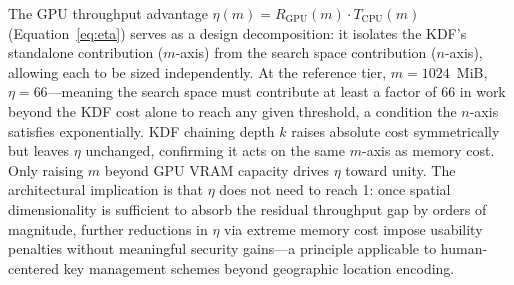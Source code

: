 \documentclass[mathematics,article,accept,pdftex,moreauthors]{Definitions/mdpi}
\begin{document}
{The GPU throughput advantage $\eta(m) = R_\text{GPU}(m)\cdot T_\text{CPU}(m)$ (Equation~\eqref{eq:eta}) serves as a design decomposition: it isolates the KDF's standalone contribution ($m$-axis) from the search space contribution ($n$-axis), allowing each to be sized independently. At the reference tier, $m=1024$~MiB, $\eta=66$---meaning the search space must contribute at least a factor of 66 in work beyond the KDF cost alone to reach any given threshold, a condition the $n$-axis satisfies exponentially. KDF chaining depth $k$ raises absolute cost symmetrically but leaves $\eta$ unchanged, confirming it acts on the same $m$-axis as memory cost. Only raising $m$ beyond GPU VRAM capacity drives $\eta$ toward unity. The architectural implication is that $\eta$ does not need to reach 1: once spatial dimensionality is sufficient to absorb the residual throughput gap by orders of magnitude, further reductions in $\eta$ via extreme memory cost impose usability penalties without meaningful security gains---a principle applicable to human-centered key management schemes beyond geographic location encoding.}


\vspace{6pt}
\end{document}
